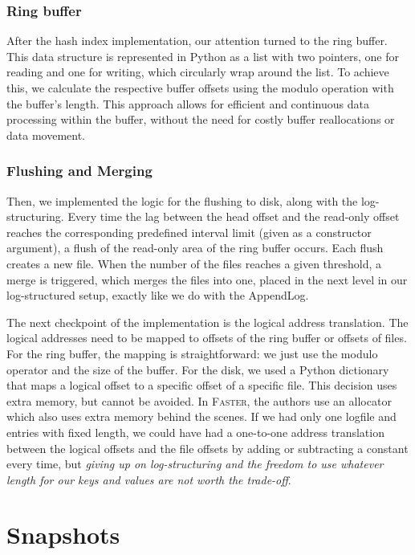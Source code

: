 \subsubsection{Ring buffer}

After the hash index implementation, our attention turned to the ring buffer.
This data structure is represented in Python as a list with two pointers, one for reading and one for writing, which circularly wrap around the list.
To achieve this, we calculate the respective buffer offsets using the modulo operation with the buffer's length.
This approach allows for efficient and continuous data processing within the buffer, without the need for costly buffer reallocations or data movement.

\subsubsection{Flushing and Merging}

Then, we implemented the logic for the flushing to disk, along with the log-structuring. Every time the lag between the head offset and the read-only offset reaches the corresponding predefined interval limit (given as a constructor argument), a flush of the read-only area of the ring buffer occurs. Each flush creates a new file. When the number of the files reaches a given threshold, a merge is triggered, which merges the files into one, placed in the next level in our log-structured setup, exactly like we do with the AppendLog.

The next checkpoint of the implementation is the logical address translation. The logical addresses need to be mapped to offsets of the ring buffer or offsets of files. For the ring buffer, the mapping is straightforward: we just use the modulo operator and the size of the buffer. For the disk, we used a Python dictionary that maps a logical offset to a specific offset of a specific file. This decision uses extra memory, but cannot be avoided. In \textsc{Faster}, the authors use an allocator which also uses extra memory behind the scenes. If we had only one logfile and entries with fixed length, we could have had a one-to-one address translation between the logical offsets and the file offsets by adding or subtracting a constant every time, but \textit{giving up on log-structuring and the freedom to use whatever length for our keys and values are not worth the trade-off}.


\section{Snapshots}
\label{section-snapshots}

